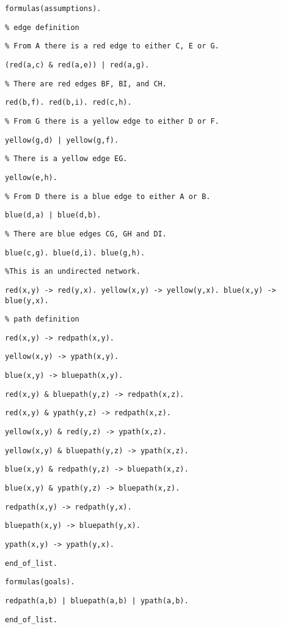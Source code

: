 \vspace{3mm}

{\footnotesize

{\tt formulas(assumptions).}

{\tt \% edge definition }

{\tt \% From A there is a red edge to either C, E or G. }

{\tt (red(a,c) \& red(a,e)) | red(a,g).}

{\tt \% There are red edges BF, BI, and CH. }

{\tt red(b,f). red(b,i). red(c,h).}

{\tt \% From G there is a yellow edge to either D or F.}

{\tt yellow(g,d) | yellow(g,f).}

{\tt \% There is a yellow edge EG.}

{\tt yellow(e,h).}

{\tt \% From D there is a blue edge to either A or B.}

{\tt blue(d,a) | blue(d,b).}

{\tt \% There are blue edges CG, GH and DI. }

{\tt blue(c,g). blue(d,i). blue(g,h).}

{\tt \%This is an undirected network.}

{\tt red(x,y) -> red(y,x). yellow(x,y) -> yellow(y,x). blue(x,y) -> blue(y,x).}

{\tt \% path definition}

{\tt red(x,y) -> redpath(x,y).}

{\tt yellow(x,y) -> ypath(x,y).}

{\tt blue(x,y) -> bluepath(x,y).}

{\tt red(x,y) \& bluepath(y,z) -> redpath(x,z).}

{\tt red(x,y) \& ypath(y,z) -> redpath(x,z).}

{\tt yellow(x,y) \& red(y,z) -> ypath(x,z).}

{\tt yellow(x,y) \& bluepath(y,z) -> ypath(x,z).}

{\tt blue(x,y) \& redpath(y,z) -> bluepath(x,z).}

{\tt blue(x,y) \& ypath(y,z) -> bluepath(x,z).}

{\tt redpath(x,y) -> redpath(y,x).}

{\tt bluepath(x,y) -> bluepath(y,x).}

{\tt ypath(x,y) -> ypath(y,x).}

{\tt end\_of\_list.}

{\tt formulas(goals).}

{\tt redpath(a,b) | bluepath(a,b) | ypath(a,b).}

{\tt end\_of\_list.}

}

